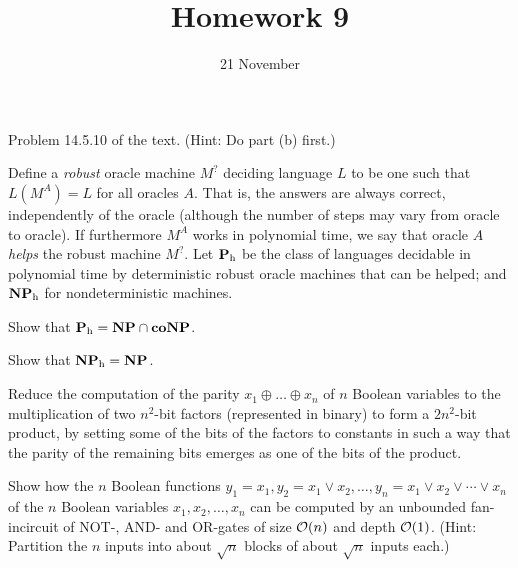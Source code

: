 \documentclass{../math167}
\title{Homework 9}
\author{}
\date{21 November}
\begin{document}
\begin{problems}
\item Problem 14.5.10 of the text.  (Hint: Do part (b) first.)

  \newcommand{\h}{_\mathrm h}

  \begin{book}

    Define a \emph{robust} oracle machine \(M^?\) deciding language
    \(L\) to be one such that \(L(M^A) = L\) for all oracles \(A\).
    That is, the answers are always correct, independently of the
    oracle (although the number of steps may vary from oracle to
    oracle).  If furthermore \(M^A\) works in polynomial time, we say
    that oracle \(A\) \emph{helps} the robust machine \(M^?\).  Let
    \(\P\h\) be the class of languages decidable in polynomial time by
    deterministic robust oracle machines that can be helped; and
    \(\NP\h\) for nondeterministic machines.
    \begin{problems}
    \item Show that \(\P\h = \NP \cap \co\NP\).
    \item Show that \(\NP\h = \NP\).
    \end{problems}
  \end{book}

  \begin{solution}
    \begin{problems}
    \item
    \item
    \end{problems}
  \end{solution}

\item Reduce the computation of the parity
  \(x_1 \oplus \dots \oplus x_n\) of \(n\) Boolean variables to the
  multiplication of two \(n^2\)-bit factors (represented in binary) to
  form a \(2n^2\)-bit product, by setting some of the bits of the
  factors to constants in such a way that the parity of the remaining
  bits emerges as one of the bits of the product.

  \begin{solution}
  \end{solution}

\item Show how the \(n\) Boolean functions
  \(y_1=x_1, y_2 = x_1 \lor x_2, \dots, y_n = x_1 \lor x_2 \lor \cdots
  \lor x_n\) of the \(n\) Boolean variables \(x_1, x_2, \dots, x_n\)
  can be computed by an unbounded fan-incircuit of NOT-, AND- and
  OR-gates of size \(\mathcal O(n)\) and depth \(\mathcal O(1)\). (Hint: Partition the
  \(n\) inputs into about \(\sqrt n\) blocks of about \(\sqrt n\)
  inputs each.)

  \begin{solution}
  \end{solution}

\end{problems}
\end{document}

